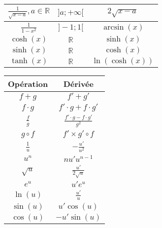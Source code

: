 \documentclass[8pt]{article}
\begin{document}
\begin{center}
\begin{tabular}{|c|c|c|}
                            \hline
                            $ \frac{1}{\sqrt{x-a}}, a \in \mathbb{R}$ & $ ]a;+\infty[ $ & $ 2\sqrt{x-a}$\\
                            \hline
                            $ \frac{1}{1-x^2}$ & $ ]-1;1[$ & $ \arcsin(x)$\\
                            \hline
                            $ \cosh(x)$ & $ \mathbb{R}$ & $ \sinh(x)$\\
                            \hline 
                            $ \sinh(x)$ & $ \mathbb{R}$ & $ \cosh(x)$\\
                            \hline
                            $ \tanh(x)$ & $ \mathbb{R} $ & $ \ln(\cosh(x))$\\
                            \hline 
                        \end{tabular}
                    \end{center}
                    \begin{center}
                        \renewcommand{\arraystretch}{1.5}
                        \begin{tabular}{|c|c|}
                            \hline
                            \textbf{Opération} & \textbf{Dérivée} \\
                            \hline 
                            \hline
                            $f+g$ & $f'+g'$\\
                            \hline
                            $f \cdot g$ & $f' \cdot g + f \cdot g'$\\
                            \hline
                            $\frac{f}{g} $ & $\frac{f' \cdot g - f \cdot g'}{g^2}$\\
                            \hline
                            $g \circ f$ & $f'\times g' \circ f$\\
                            \hline
                            $\frac{1}{u}$ & $-\frac{u'}{u^2}$\\
                            \hline
                            $u^n$ & $nu'u^{n-1}$\\
                            \hline
                            $\sqrt{u}$ & $\frac{u'}{2\sqrt{u}}$\\
                            \hline
                            $e^{u}$ & $u'e^{u}$\\
                            \hline
                            $\ln(u)$ & $\frac{u'}{u}$\\
                            \hline
                            $\sin(u)$ & $u'\cos(u)$\\
                            \hline
                            $\cos(u)$ & $-u'\sin(u)$\\
                            \hline
                        \end{tabular}
                    \end{center}
\end{document}
